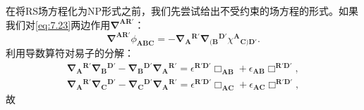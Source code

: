 在将RS场方程化为NP形式之前，我们先尝试给出不受约束的场方程的形式。如果我们对\ref{eq:7.23}两边作用$\mathbf{\nabla }^{\boldsymbol{AR} '}$：
\begin{equation}
	\mathbf{\nabla }^{\boldsymbol{AR} '} \phi _{\boldsymbol{ABC}} =-\mathbf{\nabla }{_{\boldsymbol{A}}}^{\boldsymbol{R} '}\mathbf{\nabla }{_{(\boldsymbol{B}}}^{\boldsymbol{D} '} \chi ^{\boldsymbol{A}}{}_{\boldsymbol{C})\boldsymbol{D} '} .
	\label{eq:7.29}
\end{equation}
利用导数算符对易子的分解：
\begin{gather*}
	\mathbf{\nabla }{_{\boldsymbol{A}}}^{\boldsymbol{R} '}\mathbf{\nabla }{_{\boldsymbol{B}}}^{\boldsymbol{D} '} -\mathbf{\nabla }{_{\boldsymbol{B}}}^{\boldsymbol{D} '}\mathbf{\nabla }{_{\boldsymbol{A}}}^{\boldsymbol{R} '} =\epsilon ^{\boldsymbol{R} '\boldsymbol{D} '} \Box _{\boldsymbol{AB}} +\epsilon _{\boldsymbol{AB}} \Box ^{\boldsymbol{R} '\boldsymbol{D} '} ,\\
	\mathbf{\nabla }{_{\boldsymbol{A}}}^{\boldsymbol{R} '}\mathbf{\nabla }{_{\boldsymbol{C}}}^{\boldsymbol{D} '} -\mathbf{\nabla }{_{\boldsymbol{C}}}^{\boldsymbol{D} '}\mathbf{\nabla }{_{\boldsymbol{A}}}^{\boldsymbol{R} '} =\epsilon ^{\boldsymbol{R} '\boldsymbol{D} '} \Box _{\boldsymbol{AC}} +\epsilon _{\boldsymbol{AC}} \Box ^{\boldsymbol{R} '\boldsymbol{D} '} ,
\end{gather*}
故
